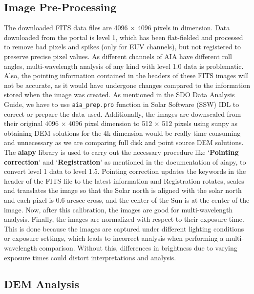 \subsection{Image Pre-Processing}
\label{sec:data_pre_processing}

The downloaded FITS data files are 4096 $\times$ 4096 pixels in dimension. Data downloaded from the portal is level 1, which has been flat-fielded and processed to remove bad pixels and spikes (only for EUV channels), but not registered to preserve precise pixel values. As different channels of AIA have different roll angles, multi-wavelength analysis of any kind with level 1.0 data is problematic. Also, the pointing information contained in the headers of these FITS images will not be accurate, as it would have undergone changes compared to the information stored when the image was created. As mentioned in the SDO Data Analysis Guide, we have to use \texttt{aia\_prep.pro} function in Solar Software (SSW) IDL to correct or prepare the data used. Additionally, the images are downscaled from their original 4096 $\times$ 4096 pixel dimension to 512 $\times$ 512 pixels using sunpy as obtaining DEM solutions for the 4k dimension would be really time consuming and unnecessary as we are comparing full disk and point source DEM solutions.\\

The \textbf{aiapy} library is used to carry out the necessary procedure like `\textbf{Pointing correction}' and `\textbf{Registration}' as mentioned in the documentation of aiapy, to convert level 1 data to level 1.5. Pointing correction updates the keywords in the header of the FITS file to the latest information and Registration rotates, scales and translates the image so that the Solar north is aligned with the solar north and each pixel is 0.6 arcsec cross, and the center of the Sun is at the center of the image. Now, after this calibration, the images are good for multi-wavelength analysis. Finally, the images are normalized with respect to their exposure time. This is done because the images are captured under different lighting conditions or exposure settings, which leads to incorrect analysis when performing a multi-wavelength comparison. Without this, differences in brightness due to varying exposure times could distort interpretations and analysis.

\subsection{DEM Analysis}
\label{sec:dem_analysis}

